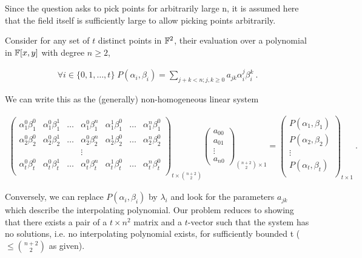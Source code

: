 \question
Since the question asks to pick points for arbitrarily large n, it is assumed
here that the field itself is sufficiently large to allow picking points
arbitrarily.

Consider for any set of \(t\) distinct points in \(\mathbb{F}^2\), their evaluation
over a polynomial in \(\mathbb{F}[x, y]\) with degree \(n \geq 2\),

\begin{gather*}
    \forall i \in \{0, 1, \ldots, t\}\; P(\alpha_i, \beta_i) = \sum_{j + k < n; j, k \geq 0} a_{jk} \alpha_i^j \beta_i^k ~.
\end{gather*}

We can write this as the (generally) non-homogeneous linear system

\begin{gather*}
    \begin{pmatrix}
        \alpha_1^0\beta_1^0 & \alpha_1^0\beta_1^1 & \ldots & \alpha_1^0\beta_1^n & \alpha_1^1\beta_1^0 & \ldots & \alpha_1^n\beta_1^0 \\
        \alpha_2^0\beta_2^0 & \alpha_2^0\beta_2^1 & \ldots & \alpha_2^0\beta_2^n & \alpha_2^1\beta_2^0 & \ldots & \alpha_2^n\beta_2^0 \\
        &&& \vdots &&& \\
        \alpha_t^0\beta_t^0 & \alpha_t^0\beta_t^1 & \ldots & \alpha_t^0\beta_t^n & \alpha_t^1\beta_t^0 & \ldots & \alpha_t^n\beta_t^0 \\
    \end{pmatrix}_{t \times \binom{n+2}{2}}
    \begin{pmatrix}
        a_{00}\\
        a_{01}\\
        \vdots\\
        a_{n0}
    \end{pmatrix}_{\binom{n+2}{2}\times 1}
    = 
    \begin{pmatrix}
        P(\alpha_1, \beta_1) \\
        P(\alpha_2, \beta_2) \\
        \vdots \\
        P(\alpha_t, \beta_t) \\
    \end{pmatrix}_{t\times 1}~.
\end{gather*}

Conversely, we can replace \(P(\alpha_i, \beta_i)\) by \(\lambda_i\) and look
for the parameters \(a_{jk}\) which describe the interpolating polynomial. Our
problem reduces to showing that there exists a pair of a \(t \times n^2\) matrix
and a \(t\)-vector such that the system has no solutions, i.e. no interpolating
polynomial exists, for sufficiently bounded t (\(\leq \binom{n+2}{2}\) as
given).

